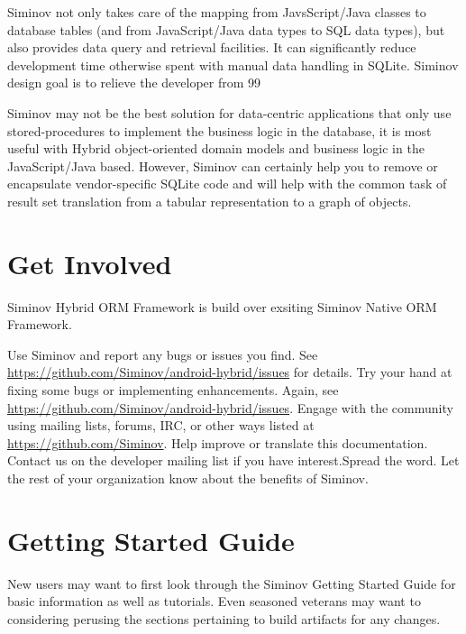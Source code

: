 Siminov not only takes care of the mapping from JavsScript/Java classes to database tables (and from JavaScript/Java data types to SQL data types), but also provides data query and retrieval facilities. It can significantly reduce development time otherwise spent with manual data handling in SQLite. Siminov design goal is to relieve the developer from 99%

Siminov may not be the best solution for data-centric applications that only use stored-procedures to implement the business logic in the database, it is most useful with Hybrid object-oriented domain models and business logic in the JavaScript/Java based. However, Siminov can certainly help you to remove or encapsulate vendor-specific SQLite code and will help with the common task of result set translation from a tabular representation to a graph of objects.


\section{Get Involved}

Siminov Hybrid ORM Framework is  build over exsiting Siminov Native ORM Framework.

Use Siminov and report any bugs or issues you find. See \url{https://github.com/Siminov/android-hybrid/issues} for details. Try your hand at fixing some bugs or implementing enhancements. Again, see \url{https://github.com/Siminov/android-hybrid/issues}. Engage with the community using mailing lists, forums, IRC, or other ways listed at \url{https://github.com/Siminov}. Help improve or translate this documentation. Contact us on the developer mailing list if you have interest.Spread the word. Let the rest of your organization know about the benefits of Siminov.


\section{Getting Started Guide}

New users may want to first look through the Siminov Getting Started Guide for basic information as well as tutorials. Even seasoned veterans may want to considering perusing the sections pertaining to build artifacts for any changes.
